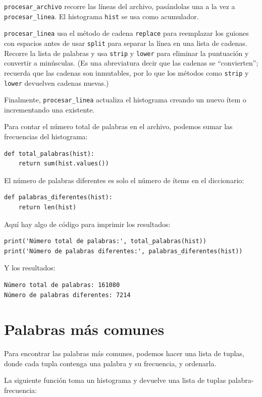 \documentclass[10pt]{book}
\begin{document}
\verb"procesar_archivo" recorre las líneas del archivo,
pasándolas una a la vez a \verb"procesar_linea".  El histograma
{\tt hist} se usa como acumulador.

\verb"procesar_linea" usa el método de cadena {\tt replace} para reemplazar
los guiones con espacios antes de usar {\tt split} para separar la línea en una
lista de cadenas.  Recorre la lista de palabras y usa {\tt strip}
y {\tt lower} para eliminar la puntuación y convertir a minúsculas.  (Es
una abreviatura decir que las cadenas se ``convierten''; recuerda que
las cadenas son inmutables, por lo que los métodos como {\tt strip} y {\tt lower}
devuelven cadenas nuevas.)

Finalmente, \verb"procesar_linea" actualiza el histograma creando un nuevo
ítem o incrementando una existente.

Para contar el número total de palabras en el archivo, podemos sumar
las frecuencias del histograma:

\begin{verbatim}
def total_palabras(hist):
    return sum(hist.values())
\end{verbatim}
%
El número de palabras diferentes es solo el número de ítems en
el diccionario:

\begin{verbatim}
def palabras_diferentes(hist):
    return len(hist)
\end{verbatim}
%
Aquí hay algo de código para imprimir los resultados:

\begin{verbatim}
print('Número total de palabras:', total_palabras(hist))
print('Número de palabras diferentes:', palabras_diferentes(hist))
\end{verbatim}
%
Y los resultados:

\begin{verbatim}
Número total de palabras: 161080
Número de palabras diferentes: 7214
\end{verbatim}
%

\section{Palabras más comunes}

Para encontrar las palabras más comunes, podemos hacer una lista de tuplas,
donde cada tupla contenga una palabra y su frecuencia,
y ordenarla.

La siguiente función toma un histograma y devuelve una lista de
tuplas palabra-frecuencia:
\end{document}
